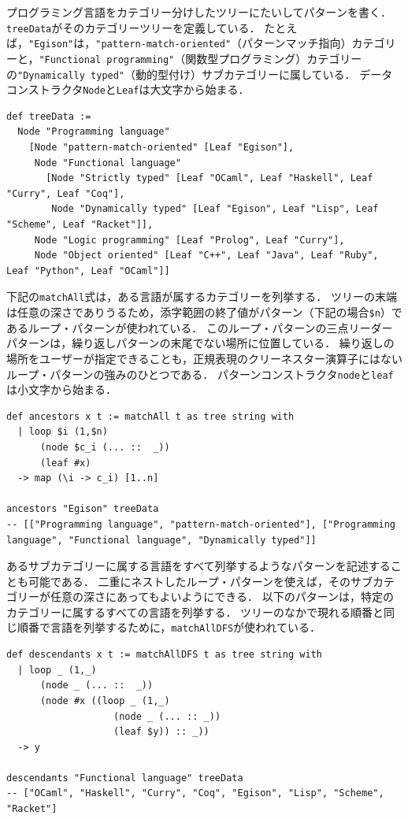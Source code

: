 プログラミング言語をカテゴリー分けしたツリーにたいしてパターンを書く．
\lstinline{treeData}がそのカテゴリーツリーを定義している．
たとえば，\lstinline{"Egison"}は，\lstinline{"pattern-match-oriented"}（パターンマッチ指向）カテゴリーと，\lstinline{"Functional programming"}（関数型プログラミング）カテゴリーの\lstinline{"Dynamically typed"}（動的型付け）サブカテゴリーに属している．
データコンストラクタ\lstinline{Node}と\lstinline{Leaf}は大文字から始まる．
\begin{lstlisting}[language=egison,numbers=none]
def treeData :=
  Node "Programming language"
    [Node "pattern-match-oriented" [Leaf "Egison"],
     Node "Functional language"
       [Node "Strictly typed" [Leaf "OCaml", Leaf "Haskell", Leaf "Curry", Leaf "Coq"],
        Node "Dynamically typed" [Leaf "Egison", Leaf "Lisp", Leaf "Scheme", Leaf "Racket"]],
     Node "Logic programming" [Leaf "Prolog", Leaf "Curry"],
     Node "Object oriented" [Leaf "C++", Leaf "Java", Leaf "Ruby", Leaf "Python", Leaf "OCaml"]]
\end{lstlisting}

下記の\lstinline{matchAll}式は，ある言語が属するカテゴリーを列挙する．
ツリーの末端は任意の深さでありうるため，添字範囲の終了値がパターン（下記の場合\lstinline{$n}）であるループ・パターンが使われている．
このループ・パターンの三点リーダーパターンは，繰り返しパターンの末尾でない場所に位置している．
繰り返しの場所をユーザーが指定できることも，正規表現のクリーネスター演算子にはないループ・パターンの強みのひとつである．
パターンコンストラクタ\lstinline{node}と\lstinline{leaf}は小文字から始まる．
\begin{lstlisting}[language=egison,numbers=none]
def ancestors x t := matchAll t as tree string with
  | loop $i (1,$n)
      (node $c_i (... ::  _))
      (leaf #x)
  -> map (\i -> c_i) [1..n]

ancestors "Egison" treeData
-- [["Programming language", "pattern-match-oriented"], ["Programming language", "Functional language", "Dynamically typed"]]
\end{lstlisting}

あるサブカテゴリーに属する言語をすべて列挙するようなパターンを記述することも可能である．
二重にネストしたループ・パターンを使えば，そのサブカテゴリーが任意の深さにあってもよいようにできる．
以下のパターンは，特定のカテゴリーに属するすべての言語を列挙する．
ツリーのなかで現れる順番と同じ順番で言語を列挙するために，\lstinline{matchAllDFS}が使われている．
\begin{lstlisting}[language=egison,numbers=none]
def descendants x t := matchAllDFS t as tree string with
  | loop _ (1,_)
      (node _ (... ::  _))
      (node #x ((loop _ (1,_)
                   (node _ (... :: _))
                   (leaf $y)) :: _))
  -> y

descendants "Functional language" treeData
-- ["OCaml", "Haskell", "Curry", "Coq", "Egison", "Lisp", "Scheme", "Racket"]
\end{lstlisting}

